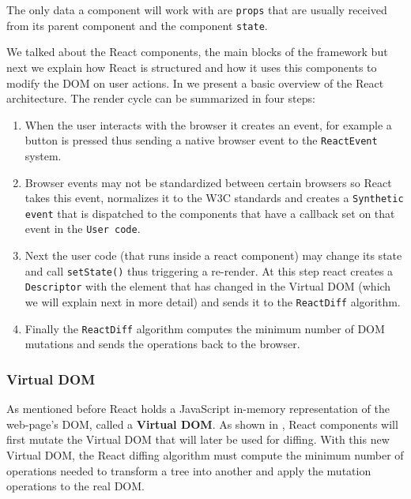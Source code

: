 The only data a component will work with are \texttt{props} that are  usually received from its parent component and the component \texttt{state}.

We talked about the React components, the main blocks of the framework but next we explain how React is structured and how it uses this components to modify the DOM on user actions. In  we present a basic overview of the React architecture. The render cycle can be summarized in four steps:

\begin{enumerate}
	\item When the user interacts with the browser it creates an event, for example a button is pressed thus sending a native browser event to the \texttt{ReactEvent} system.
	\item  Browser events may not be standardized between certain browsers so React takes this event, normalizes it to the W3C standards and creates a \texttt{Synthetic event} that is dispatched to the components that have a callback set on that event in the \texttt{User code}.
	\item Next the user code (that runs inside a react component) may change its state and call \texttt{setState()} thus triggering a re-render. At this step react creates a \texttt{Descriptor} with the element that has changed in the Virtual DOM (which we will explain next in more detail) and sends it to the \texttt{ReactDiff} algorithm.
	\item Finally the \texttt{ReactDiff} algorithm computes the minimum number of DOM mutations and sends the operations back to the browser.
\end{enumerate}


\subsubsection{Virtual DOM}
\label{sub-sub-sec:virtual-dom}

As mentioned before React holds a JavaScript in-memory representation of the web-page's DOM, called a \textbf{Virtual DOM}. As shown in , React components will first mutate the Virtual DOM that will later be used for diffing. With this new Virtual DOM, the React diffing algorithm must compute the minimum number of operations needed to transform a tree into another and apply the mutation operations to the real DOM.

